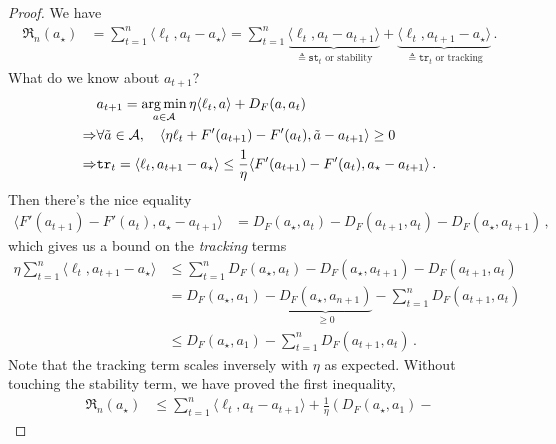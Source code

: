 \documentclass{article}
\theoremstyle{plain}
\theoremstyle{definition}
\newcommand{\argmin}{\operatornamewithlimits{arg\,min}}
\newcommand{\Reg}{\mathfrak{R}}
\newcommand{\cA}{\mathcal A}
\begin{document}
\begin{proof}
    We have
    \begin{align*}
        \Reg_n(a_\star)
         & = \sum_{t=1}^{n} \langle \ell_t, a_t - a_\star \rangle
        = \sum_{t=1}^{n} \underbrace{\langle \ell_t, a_t - a_{t+1} \rangle}_{\triangleq \texttt{st}_t \text{ or stability}} + \underbrace{\langle \ell_t, a_{t+1} - a_\star \rangle}_{\triangleq \texttt{tr}_t \text{ or tracking}}\,.
    \end{align*}
    What do we know about $a_{t+1}$?
    \begin{align*}
                    & a_{t+1} = \argmin_{a \in \cA} \eta \langle \ell_t, a \rangle + D_F(a, a_t)                                                                \\
        \Rightarrow &
        \forall \tilde{a} \in \cA, \quad
        \langle \eta \ell_t + F'(a_{t+1}) - F'(a_t), \tilde{a} - a_{t+1} \rangle \geq 0                                                                         \\
        \Rightarrow
                    & \texttt{tr}_t = \langle \ell_t, a_{t+1} - a_\star \rangle \leq \frac{1}{\eta} \langle F'(a_{t+1}) - F'(a_t), a_\star - a_{t+1} \rangle\,.
    \end{align*}
    Then there's the nice equality
    \begin{align*}
        \langle F'(a_{t+1}) - F'(a_t), a_\star - a_{t+1} \rangle
         & =
        D_F(a_\star, a_t) - D_F(a_{t+1}, a_t) - D_F(a_\star, a_{t+1})\,,
    \end{align*}
    which gives us a bound on the \textit{tracking} terms
    \begin{align*}
        \eta \sum_{t=1}^{n} \langle \ell_t, a_{t+1} - a_\star \rangle
         & \leq \sum_{t=1}^{n} D_F(a_\star, a_t)  - D_F(a_\star, a_{t+1}) - D_F(a_{t+1}, a_t)                   \\
         & = D_F(a_\star, a_1) - \underbrace{D_F(a_\star, a_{n+1})}_{\geq 0} - \sum_{t=1}^{n} D_F(a_{t+1}, a_t) \\
         & \leq D_F(a_\star, a_1) - \sum_{t=1}^{n} D_F(a_{t+1}, a_t)\,.
    \end{align*}
    Note that the tracking term scales inversely with $\eta$ as expected.
    Without touching the stability term, we have proved the first inequality,
    \begin{align*}
        \Reg_n(a_\star)
         & \leq
        \sum_{t=1}^{n} \langle \ell_t, a_t - a_{t+1} \rangle
        + \frac{1}{\eta}
        \left(
        D_F(a_\star, a_1) -

\end{align*}
\end{proof}
\end{document}
